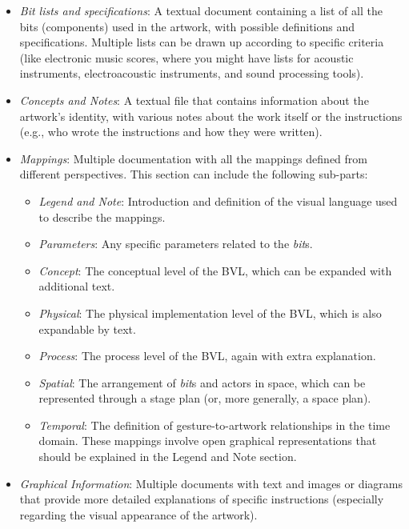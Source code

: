 \begin{itemize}
    \item \textit{Bit lists and specifications}: A textual document containing a list of all the bits (components) used in the artwork, with possible definitions and specifications. Multiple lists can be drawn up according to specific criteria (like electronic music scores, where you might have lists for acoustic instruments, electroacoustic instruments, and sound processing tools).
    \item \textit{Concepts and Notes}: A textual file that contains information about the artwork's identity, with various notes about the work itself or the instructions (e.g., who wrote the instructions and how they were written).
    \item \textit{Mappings}: Multiple documentation with all the mappings defined from different perspectives. This section can include the following sub-parts:
    \begin{itemize}
        \item \textit{Legend and Note}: Introduction and definition of the visual language used to describe the mappings.
        \item \textit{Parameters}: Any specific parameters related to the \textit{bit}s.
        \item \textit{Concept}: The conceptual level of the BVL, which can be expanded with additional text.
        \item \textit{Physical}: The physical implementation level of the BVL, which is also expandable by text.
        \item \textit{Process}: The process level of the BVL, again with extra explanation.
        \item \textit{Spatial}: The arrangement of \textit{bit}s and actors in space, which can be represented through a stage plan (or, more generally, a space plan).
        \item \textit{Temporal}: The definition of gesture-to-artwork relationships in the time domain. These mappings involve open graphical representations that should be explained in the Legend and Note section.
    \end{itemize}
    \item \textit{Graphical Information}: Multiple documents with text and images or diagrams that provide more detailed explanations of specific instructions (especially regarding the visual appearance of the artwork).
\end{itemize}

